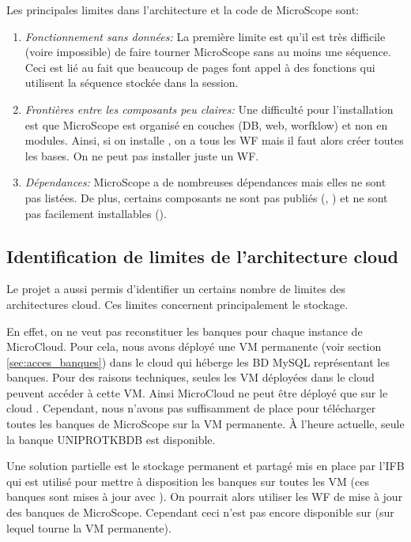 Les principales limites dans l'architecture et la code de MicroScope sont:
\begin{enumerate}
    \item \emph{Fonctionnement sans données:} La première limite est
          qu'il est très difficile (voire impossible) de faire tourner MicroScope sans au moins une séquence.
          Ceci est lié au fait que beaucoup de pages font appel à des fonctions qui utilisent la séquence stockée dans la session.
    \item \emph{Frontières entre les composants peu claires:} Une difficulté pour l'installation est que MicroScope est organisé en couches (DB, web, worfklow) et non en modules.
          Ainsi, si on installe , on a tous les WF mais il faut alors créer toutes les bases.
          On ne peut pas installer juste un WF.
    \item \emph{Dépendances:} MicroScope a de nombreuses dépendances mais elles ne sont pas listées.
          De plus, certains composants ne sont pas publiés (, )
          et ne sont pas facilement installables ().
\end{enumerate}

\subsection{Identification de limites de l'architecture cloud} \label{subsec:limites_coud}

Le projet a aussi permis d'identifier un certains nombre de limites des architectures cloud.
Ces limites concernent principalement le stockage.

En effet, on ne veut pas reconstituer les banques pour chaque instance de MicroCloud.
Pour cela, nous  avons déployé une VM permanente (voir section \ref{sec:acces_banques}) dans le cloud 
qui héberge les BD MySQL représentant les banques.
Pour des raisons techniques, seules les VM déployées dans le cloud 
peuvent accéder à cette VM.
Ainsi MicroCloud ne peut être déployé que sur le cloud .
Cependant, nous n'avons pas suffisamment de place pour télécharger toutes les banques de MicroScope sur la VM permanente.
À l'heure actuelle, seule la banque UNIPROTKBDB est disponible.

Une solution partielle est le stockage permanent et partagé mis en place par l'IFB
qui est utilisé pour mettre à disposition les banques sur toutes les VM (ces banques sont mises à jour avec ).
On pourrait alors utiliser les WF de mise à jour des banques de MicroScope.
Cependant ceci n'est pas encore disponible sur  (sur lequel tourne la VM permanente).

